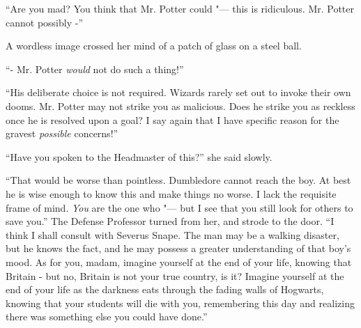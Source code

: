 ``Are you mad? You think that Mr. Potter could "--- this is ridiculous. Mr.
Potter cannot possibly -''

A wordless image crossed her mind of a patch of glass on a steel ball.

``- Mr. Potter \emph{would} not do such a thing!''

``His deliberate choice is not required. Wizards rarely set out to invoke
their own dooms. Mr. Potter may not strike you as malicious. Does he
strike you as reckless once he is resolved upon a goal? I say again that
I have specific reason for the gravest \emph{possible} concerns!''

``Have you spoken to the Headmaster of this?'' she said slowly.

``That would be worse than pointless. Dumbledore cannot reach the boy. At
best he is wise enough to know this and make things no worse. I lack the
requisite frame of mind. \emph{You} are the one who "--- but I see that you
still look for others to save you.'' The Defense Professor turned from
her, and strode to the door. ``I think I shall consult with Severus
Snape. The man may be a walking disaster, but he knows the fact, and he
may possess a greater understanding of that boy's mood. As for you,
madam, imagine yourself at the end of your life, knowing that Britain -
but no, Britain is not your true country, is it? Imagine yourself at the
end of your life as the darkness eats through the fading walls of
Hogwarts, knowing that your students will die with you, remembering this
day and realizing there was something else you could have done.''
